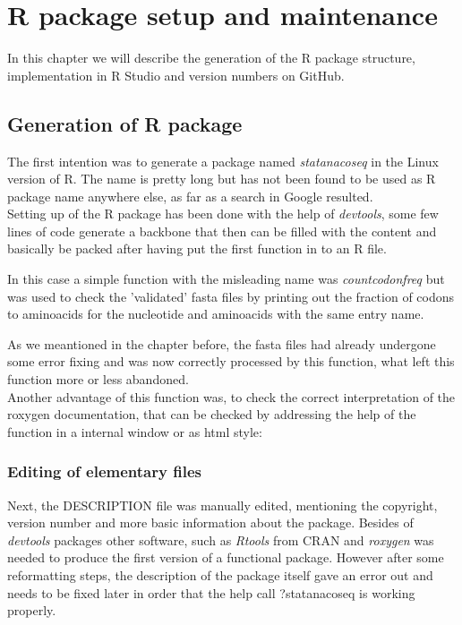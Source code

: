 \chapter{R package setup and maintenance}
In this chapter we will describe the generation of the R package structure, implementation in R Studio and version numbers on GitHub.


\section{Generation of R package}
The first intention was to generate a package named \textit{statanacoseq} in the Linux version of R. The name is pretty long but has not been found to be used as R package name anywhere else, as far as a search in Google resulted. \\
Setting up of the R package has been done with the help of \textit{devtools}, some few lines of code generate a backbone that then can be filled with the content and basically be packed after having put the first function in to an R file. 

  

In this case a simple function with the misleading name was \textit{countcodonfreq} but was used to check the 'validated' fasta files by printing out the fraction of codons to aminoacids for the nucleotide and aminoacids with the same entry name. 
  
As we meantioned in the chapter before, the fasta files had already undergone some error fixing and was now correctly processed by this function, what left this function more or less abandoned. \\
Another advantage of this function was, to check the correct interpretation of the roxygen documentation, that can be checked by addressing the help of the function in a internal window or as html style:
  

\subsection{Editing of elementary files}
Next, the DESCRIPTION file was manually edited, mentioning the copyright, version number and more basic information about the package. Besides of \textit{devtools} packages other software, such as \textit{Rtools} from CRAN and \textit{roxygen} was needed to produce the first version of a functional package. However after some reformatting steps, the description of the package itself gave an error out and needs to be fixed later in order that the help call ?statanacoseq is working properly. \\

